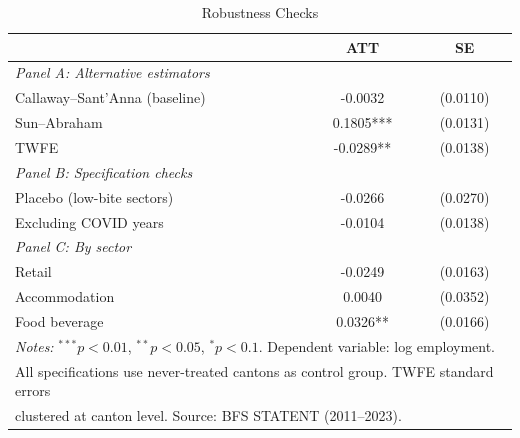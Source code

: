 \begin{table}[htbp]
\centering
\caption{Robustness Checks}
\label{tab:robust}
\begin{tabular}{lcc}
\hline\hline
 & ATT & SE \\
\hline
\textit{Panel A: Alternative estimators} & & \\
\quad Callaway--Sant'Anna (baseline) & -0.0032 & (0.0110) \\
\quad Sun--Abraham & 0.1805*** & (0.0131) \\
\quad TWFE & -0.0289** & (0.0138) \\
\textit{Panel B: Specification checks} & & \\
\quad Placebo (low-bite sectors) & -0.0266 & (0.0270) \\
\quad Excluding COVID years & -0.0104 & (0.0138) \\
\textit{Panel C: By sector} & & \\
\quad Retail & -0.0249 & (0.0163) \\
\quad Accommodation & 0.0040 & (0.0352) \\
\quad Food beverage & 0.0326** & (0.0166) \\
\hline\hline
\multicolumn{3}{l}{\footnotesize \textit{Notes:} $^{***}p<0.01$, $^{**}p<0.05$, $^{*}p<0.1$. Dependent variable: log employment.} \\
\multicolumn{3}{l}{\footnotesize All specifications use never-treated cantons as control group. TWFE standard errors} \\
\multicolumn{3}{l}{\footnotesize clustered at canton level. Source: BFS STATENT (2011--2023).} \\
\end{tabular}
\end{table}

